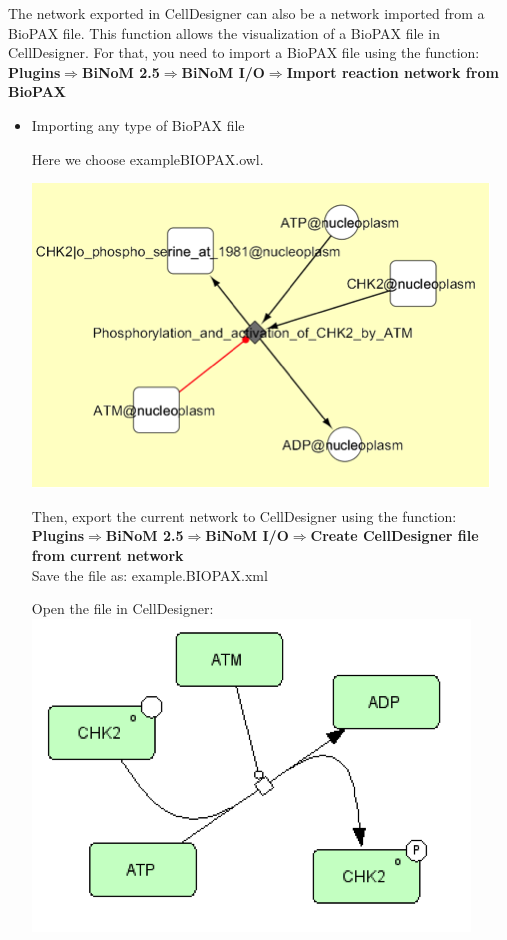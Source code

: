The network exported in CellDesigner can also be a network imported from a BioPAX file. This function allows the visualization of a BioPAX file in CellDesigner.  For that, you need to import a BioPAX file using the function:\\
\textbf{Plugins$\Rightarrow$BiNoM 2.5$\Rightarrow$BiNoM I/O$\Rightarrow$Import reaction network from BioPAX}\\


\begin{itemize}
\item Importing any type of BioPAX file 

Here we choose exampleBIOPAX.owl.

\includegraphics{graphics/example_BioPAX.png} 

Then, export the current network to CellDesigner using the function:\\
\textbf{Plugins$\Rightarrow$BiNoM 2.5$\Rightarrow$BiNoM I/O$\Rightarrow$Create CellDesigner file from current network}\\

Save the file as: example.BIOPAX.xml

Open the file in CellDesigner:\\

\includegraphics{graphics/BioPAX_to_CD.png} 


\end{itemize}
